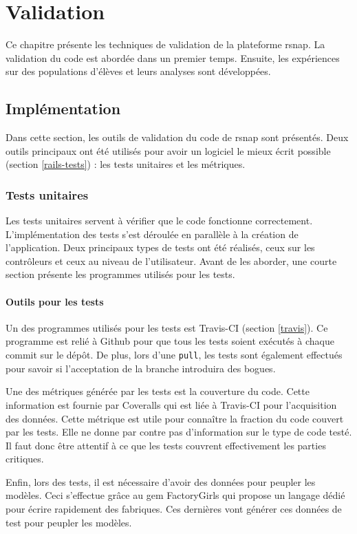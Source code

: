 \chapter{Validation}
Ce chapitre présente les techniques de validation de la plateforme \gls{rsnap}. La validation du code est abordée dans un premier temps. Ensuite, les expériences sur des populations d'élèves et leurs analyses sont développées.

\section{Implémentation}
Dans cette section, les outils de validation du code de \gls{rsnap} sont présentés. Deux outils principaux ont été utilisés pour avoir un logiciel le mieux écrit possible (section \ref{rails-tests}) : les tests unitaires et les métriques.

\subsection{Tests unitaires}
Les tests unitaires servent à vérifier que le code fonctionne correctement. L'implémentation des tests s'est déroulée en parallèle à la création de l'application. Deux principaux types de tests ont été réalisés, ceux sur les contrôleurs et ceux au niveau de l'utilisateur. Avant de les aborder, une courte section présente les programmes utilisés pour les tests.

\subsubsection{Outils pour les tests}
Un des programmes utilisés pour les tests est Travis-CI (section \ref{travis}). Ce programme est relié à Github pour que tous les tests soient exécutés à chaque commit sur le dépôt. De plus, lors d'une \texttt{\gls{pull}}, les tests sont également effectués pour savoir si l'acceptation de la branche introduira des bogues.

Une des métriques générée par les tests est la couverture du code. Cette information est fournie par Coveralls\cite{coveralls} qui est liée à Travis-CI pour l'acquisition des données. Cette métrique est utile pour connaître la fraction du code couvert par les tests. Elle ne donne par contre pas d'information sur le type de code testé. Il faut donc être attentif à ce que les tests couvrent effectivement les parties critiques.

Enfin, lors des tests, il est nécessaire d'avoir des données pour peupler les modèles. Ceci s'effectue grâce au \gls{gem} FactoryGirls \cite{factorygirls} qui propose un langage dédié pour écrire rapidement des fabriques. Ces dernières vont générer ces données de test pour peupler les modèles.

